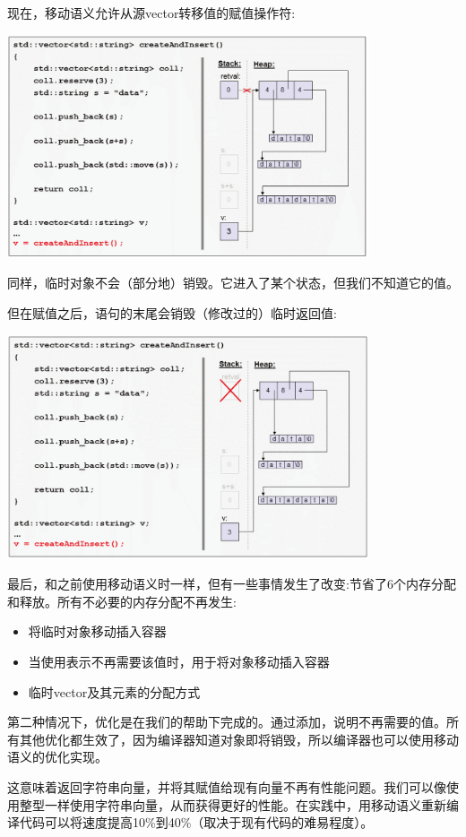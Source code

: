 \begin{itemize}
	现在，移动语义允许从源vector转移值的赋值操作符:
\begin{center}
		\includegraphics[width=0.8\textwidth]{part1/ch1/images/16}
	\end{center}
	同样，临时对象不会（部分地）销毁。它进入了某个状态，但我们不知道它的值。

	但在赋值之后，语句的末尾会销毁（修改过的）临时返回值:
\begin{center}
		\includegraphics[width=0.8\textwidth]{part1/ch1/images/17}
	\end{center}
\end{itemize}

最后，和之前使用移动语义时一样，但有一些事情发生了改变:节省了6个内存分配和释放。所有不必要的内存分配不再发生:

\begin{itemize}
	\item 将临时对象移动插入容器
	\item 当使用表示不再需要该值时，用于将对象移动插入容器
	\item 临时vector及其元素的分配方式
\end{itemize}

第二种情况下，优化是在我们的帮助下完成的。通过添加，说明不再需要的值。所有其他优化都生效了，因为编译器知道对象即将销毁，所以编译器也可以使用移动语义的优化实现。

这意味着返回字符串向量，并将其赋值给现有向量不再有性能问题。我们可以像使用整型一样使用字符串向量，从而获得更好的性能。在实践中，用移动语义重新编译代码可以将速度提高10\%到40\%（取决于现有代码的难易程度）。


























